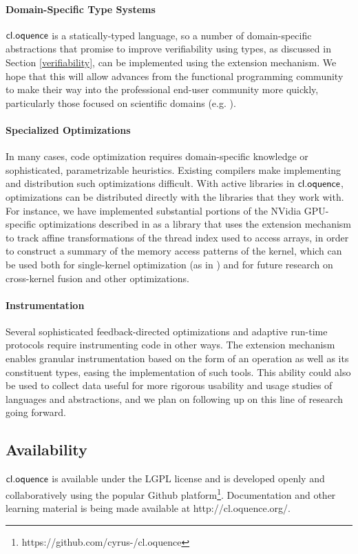 \documentclass[10pt, conference, compsocconf]{IEEEtran}
\begin{document}
\paragraph{Domain-Specific Type Systems}
$\textsf{cl.oquence}$ is a statically-typed language, so a number of domain-specific abstractions that promise to improve verifiability using types, as discussed in Section \ref{verifiability}, can be implemented using the extension mechanism. We hope that this will allow advances from the functional programming community to make their way into the professional end-user community more quickly, particularly those focused on scientific domains (e.g. \cite{conf/cefp/Kennedy09}).

\paragraph{Specialized Optimizations}
In many cases, code optimization requires domain-specific knowledge or sophisticated, parametrizable heuristics. Existing compilers make implementing and distribution such optimizations difficult. With active libraries in $\textsf{cl.oquence}$, optimizations can be distributed directly with the libraries that they work with. For instance, we have implemented substantial portions of the NVidia GPU-specific optimizations described in \cite{yang2010gpgpu} as a library that uses the extension mechanism to track affine transformations of the thread index used to access arrays, in order to construct a summary of the memory access patterns of the kernel, which can be used both for single-kernel optimization (as in \cite{yang2010gpgpu}) and for future research on cross-kernel fusion and other optimizations.

\paragraph{Instrumentation}
Several sophisticated feedback-directed optimizations and adaptive run-time protocols require instrumenting code in other ways. The extension mechanism enables granular instrumentation based on the form of an operation as well as its constituent types, easing the implementation of such tools. This ability could also be used to collect data useful for more rigorous usability and usage studies of languages and abstractions, and we plan on following up on this line of research going forward.

\subsection{Availability}
$\textsf{cl.oquence}$ is available under the LGPL license and is developed openly and collaboratively using the popular Github platform\footnote{https://github.com/cyrus-/cl.oquence}. Documentation and other learning material is being made available at http://cl.oquence.org/.
\end{document}
